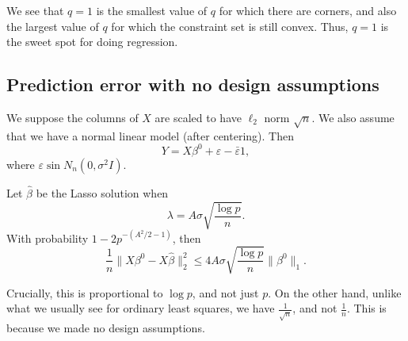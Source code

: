 \documentclass[a4paper]{article}
\begin{document}
\begin{center}
\end{center}

We see that $q = 1$ is the smallest value of $q$ for which there are corners, and also the largest value of $q$ for which the constraint set is still convex. Thus, $q = 1$ is the sweet spot for doing regression.

\subsection{Prediction error with no design assumptions}
We suppose the columns of $X$ are scaled to have $\ell_2$ norm $\sqrt{n}$. We also assume that we have a normal linear model (after centering). Then
\[
  Y = X \beta^0 + \varepsilon- \bar{\varepsilon} 1,
\]
where $\varepsilon \sin N_n(0, \sigma^2 I)$.

\begin{thm}
  Let $\hat{\beta}$ be the Lasso solution when
  \[
    \lambda = A \sigma \sqrt{\frac{\log p}{n}}.
  \]
  With probability $1 - 2p^{-(A^2/2 - 1)}$, then
  \[
    \frac{1}{n} \|X \beta^0 - X \hat{\beta}\|_2^2 \leq 4A \sigma \sqrt{\frac{\log p}{n}} \|\beta^0\|_1.
  \]
\end{thm}
Crucially, this is proportional to $\log p$, and not just $p$. On the other hand, unlike what we usually see for ordinary least squares, we have $\frac{1}{\sqrt{n}}$, and not $\frac{1}{n}$. This is because we made no design assumptions.
\end{document}
